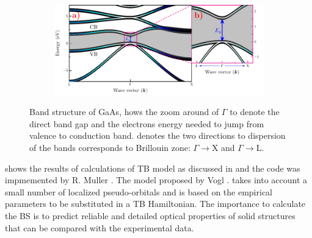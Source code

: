 \begin{figure}[h!]\label{fig:subsubsection-1.1.1-GaAsbands-1}
	\centering
	\begin{subfigure}{\textwidth}
	\includegraphics[width=\linewidth]{../figures/chapter-1/bands/build/bands01}
	\label{subfig:subsubsection-1.1.1-GaAsbands-1-a)}
	\label{subfig:subsubsection-1.1.1-GaAsbands-1-b)}
\end{subfigure}
	\caption{Band structure of GaAs,  hows the zoom around of $\Gamma$  to denote the direct band gap and the electrons energy  needed to jump from valence to conduction band.  denotes the two directions to dispersion of the bands corresponds to Brillouin zone: $\Gamma\to\mathrm{X}$ and  $\Gamma\to\mathrm{L}$.\cite{fox2002optical}}
\end{figure}

 shows the results of calculations of TB model as discussed in \cite{vogl1983asemiempirical} and the code was impmemented by R. Muller \cite{rpmuller2017}. The model proposed by Vogl .  takes into account a small number of localized pseudo-orbitals and is based on the empirical parameters to be  substituted in a TB Hamiltonian.  The importance to calculate the BS is to  predict  reliable and detailed optical properties of solid structures that can be compared with the experimental data.\\

